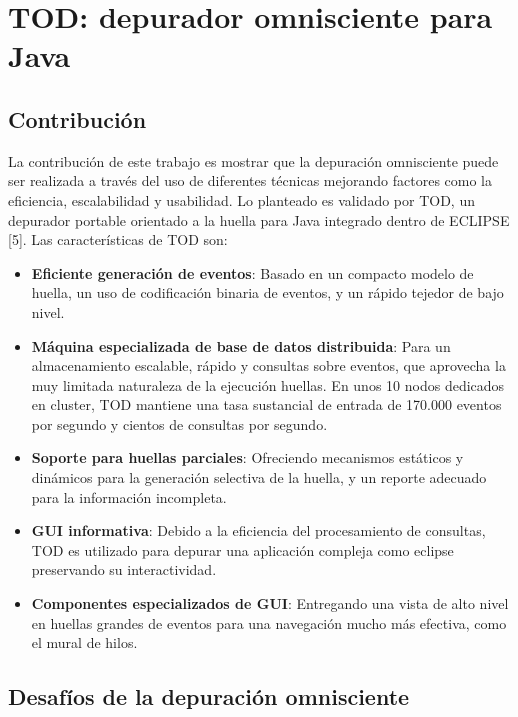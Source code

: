 \documentclass[12pt,legalpaper]{report}
\begin{document}
	\section{TOD: depurador omnisciente para Java}
		\subsection{Contribución}

La contribución de este trabajo es mostrar que la depuración omnisciente puede ser realizada a través del uso de diferentes técnicas mejorando factores como la eficiencia, escalabilidad y usabilidad.  Lo planteado es validado por TOD, un depurador portable orientado a la huella para Java integrado dentro de ECLIPSE [5].  Las características de TOD son:
\begin{itemize}
	\item \textbf{Eficiente generación de eventos}: Basado en un compacto modelo de huella, un uso de codificación binaria de eventos, y un rápido tejedor de bajo nivel.

	\item \textbf{Máquina especializada de base de datos distribuida}: Para un almacenamiento escalable, rápido y consultas sobre eventos, que aprovecha la muy limitada naturaleza de la ejecución huellas.  En unos 10 nodos dedicados en cluster, TOD mantiene una tasa sustancial de entrada de 170.000 eventos por segundo y cientos de consultas por segundo.

	\item \textbf{Soporte para huellas parciales}: Ofreciendo mecanismos estáticos y dinámicos para la generación selectiva de la huella, y un reporte adecuado para la información incompleta.

	\item \textbf{GUI informativa}: Debido a la eficiencia del procesamiento de consultas, TOD es utilizado para depurar una aplicación compleja como eclipse preservando su interactividad.

	\item \textbf{Componentes especializados de GUI}: Entregando una vista de alto nivel en huellas grandes de eventos para una navegación mucho más efectiva, como el mural de hilos.
\end{itemize}


		\subsection[Desafíos]{Desafíos de la depuración omnisciente}
\end{document}
